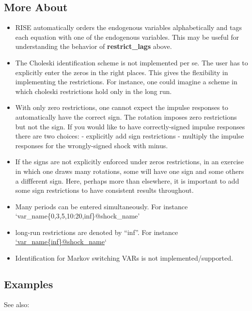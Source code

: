 \documentclass[letterpaper,10pt,english]{sphinxmanual}
\begin{document}
\subsection{More About}
\label{classes/models/@rfvar/rfvar:id170}\begin{itemize}
\item {} 
RISE automatically orders the endogenous variables alphabetically and
tags each equation with one of the endogenous variables. This may be
useful for understanding the behavior of \textbf{restrict\_lags} above.

\item {} 
The Choleski identification scheme is not implemented per se. The user
has to explicitly enter the zeros in the right places. This gives the
flexibility in implementing the restrictions. For instance, one could
imagine a scheme in which choleski restrictions hold only in the long
run.

\item {} 
With only zero restrictions, one cannot expect the impulse responses to
automatically have the correct sign. The rotation imposes zero
restrictions but not the sign. If you would like to have
correctly-signed impulse responses there are two choices:
- explicitly add sign restrictions
- multiply the impulse responses for the wrongly-signed shock with
minus.

\item {} 
If the signs are not explicitly enforced under zeros restrictions,
in an exercise in which one draws many rotations, some will have
one sign and some others a diffferent sign. Here, perhaps more than
elsewhere, it is important to add some sign restrictions to have
consistent results throughout.

\item {} 
Many periods can be entered simultaneously. For instance
`var\_name\{0,3,5,10:20,inf\}@shock\_name'

\item {} 
long-run restrictions are denoted by ``inf''. For instance
\href{mailto:'var\_name\{inf\}@shock\_name}{`var\_name\{inf\}@shock\_name}`

\item {} 
Identification for Markov switching VARs is not implemented/supported.

\end{itemize}


\subsection{Examples}
\label{classes/models/@rfvar/rfvar:id171}
See also:
\end{document}

